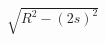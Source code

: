 \documentclass[preview]{standalone}
\begin{document}
\begin{align*}
\sqrt{R^2 - (2s)^2}
\end{align*}
\end{document}

